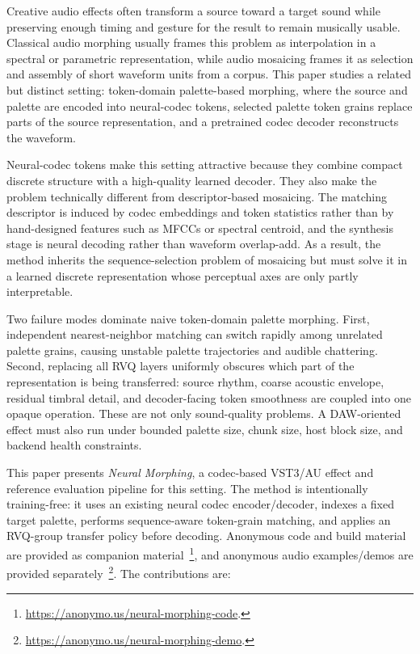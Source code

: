 \documentclass[twoside,a4paper]{article}
\begin{document}
Creative audio effects often transform a source toward a target sound while preserving enough timing and gesture for the result to remain musically usable. Classical audio morphing usually frames this problem as interpolation in a spectral or parametric representation, while audio mosaicing frames it as selection and assembly of short waveform units from a corpus. This paper studies a related but distinct setting: token-domain palette-based morphing, where the source and palette are encoded into neural-codec tokens, selected palette token grains replace parts of the source representation, and a pretrained codec decoder reconstructs the waveform.

Neural-codec tokens make this setting attractive because they combine compact discrete structure with a high-quality learned decoder. They also make the problem technically different from descriptor-based mosaicing. The matching descriptor is induced by codec embeddings and token statistics rather than by hand-designed features such as MFCCs or spectral centroid, and the synthesis stage is neural decoding rather than waveform overlap-add. As a result, the method inherits the sequence-selection problem of mosaicing but must solve it in a learned discrete representation whose perceptual axes are only partly interpretable.

Two failure modes dominate naive token-domain palette morphing. First, independent nearest-neighbor matching can switch rapidly among unrelated palette grains, causing unstable palette trajectories and audible chattering. Second, replacing all RVQ layers uniformly obscures which part of the representation is being transferred: source rhythm, coarse acoustic envelope, residual timbral detail, and decoder-facing token smoothness are coupled into one opaque operation. These are not only sound-quality problems. A DAW-oriented effect must also run under bounded palette size, chunk size, host block size, and backend health constraints.

This paper presents \emph{Neural Morphing}, a codec-based VST3/AU effect and reference evaluation pipeline for this setting. The method is intentionally training-free: it uses an existing neural codec encoder/decoder, indexes a fixed target palette, performs sequence-aware token-grain matching, and applies an RVQ-group transfer policy before decoding. Anonymous code and build material are provided as companion material~\footnote{\url{https://anonymo.us/neural-morphing-code}.}, and anonymous audio examples/demos are provided separately~\footnote{\url{https://anonymo.us/neural-morphing-demo}.}. The contributions are:
\end{document}
